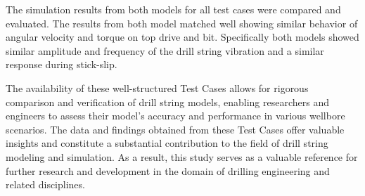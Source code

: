 The simulation results from both models for all test cases were compared and evaluated. The results from both model matched well showing similar behavior of angular velocity and torque on top drive and bit. Specifically both models showed similar amplitude and frequency of the drill string vibration and a similar response during stick-slip.

The availability of these well-structured Test Cases allows for rigorous comparison and verification of drill string models, enabling researchers and engineers to assess their model's accuracy and performance in various wellbore scenarios. The data and findings obtained from these Test Cases offer valuable insights and constitute a substantial contribution to the field of drill string modeling and simulation. As a result, this study serves as a valuable reference for further research and development in the domain of drilling engineering and related disciplines. 
